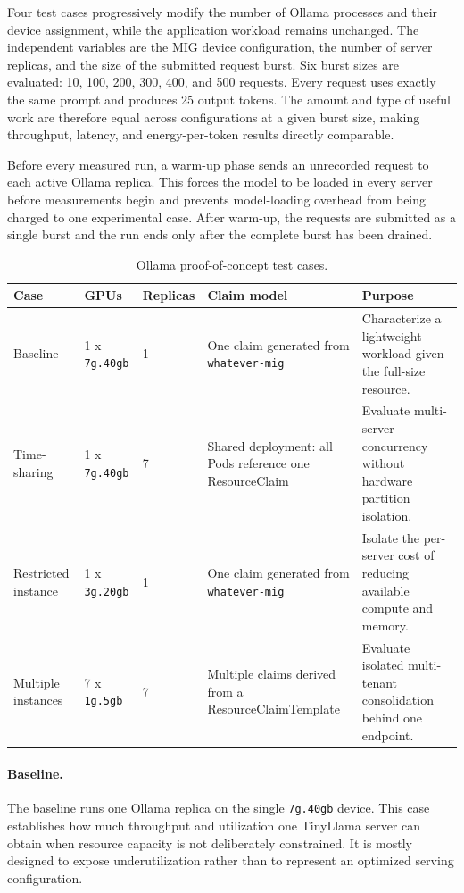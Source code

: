 Four test cases progressively modify the number of Ollama processes and their device assignment, while the application workload remains unchanged. The independent variables are the MIG device configuration, the number of server replicas, and the size of the submitted request burst. Six burst sizes are evaluated: 10, 100, 200, 300, 400, and 500 requests. Every request uses exactly the same prompt and produces 25 output tokens. The amount and type of useful work are therefore equal across configurations at a given burst size, making throughput, latency, and energy-per-token results directly comparable.

Before every measured run, a warm-up phase sends an unrecorded request to each active Ollama replica. This forces the model to be loaded in every server before measurements begin and prevents model-loading overhead from being charged to one experimental case. After warm-up, the requests are submitted as a single burst and the run ends only after the complete burst has been drained.

\begin{table}[htbp]
    \centering
    \small
    \caption{Ollama proof-of-concept test cases.}
    \label{tab:ollama-test-cases}
    \begin{tabularx}{\textwidth}{@{}p{}p{}p{}XX@{}}
        \toprule
        \textbf{Case} & \textbf{GPUs} & \textbf{Replicas} & \textbf{Claim model} & \textbf{Purpose} \\
        \midrule
        Baseline & 1 x \texttt{7g.40gb} & 1 & One claim generated from \texttt{whatever-mig} & Characterize a lightweight workload given the full-size resource. \\
        Time-sharing & 1 x \texttt{7g.40gb}  & 7 & Shared deployment: all Pods reference one ResourceClaim & Evaluate multi-server concurrency without hardware partition isolation. \\
        Restricted instance & 1 x \texttt{3g.20gb} & 1 & One claim generated from \texttt{whatever-mig} & Isolate the per-server cost of reducing available compute and memory. \\
        Multiple instances & 7 x \texttt{1g.5gb} & 7 & Multiple claims derived from a ResourceClaimTemplate & Evaluate isolated multi-tenant consolidation behind one endpoint. \\
        \bottomrule
    \end{tabularx}
\end{table}


\paragraph{Baseline.}
The baseline runs one Ollama replica on the single \texttt{7g.40gb} device. This case establishes how much throughput and utilization one TinyLlama server can obtain when resource capacity is not deliberately constrained. It is mostly designed to expose underutilization rather than to represent an optimized serving configuration.

